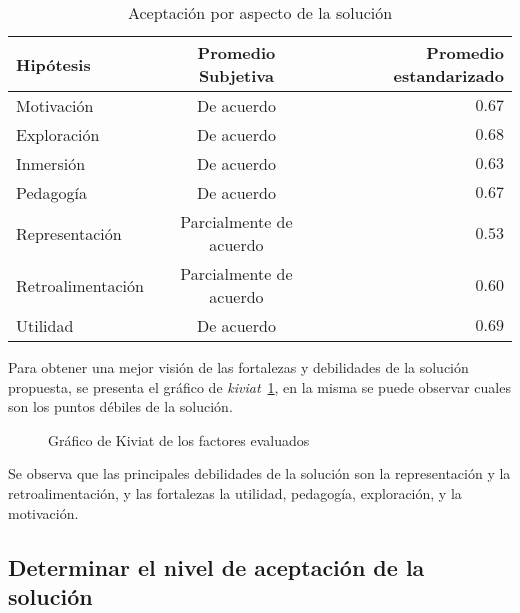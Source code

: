\begin{table}[!hbt]
\centering
\begin{tabular}{lcr}
\toprule
Hipótesis         & Promedio Subjetiva      & Promedio estandarizado \\
\midrule
Motivación        & De acuerdo              & $0.67$  \\
Exploración       & De acuerdo              & $0.68$  \\
Inmersión         & De acuerdo              & $0.63$  \\
Pedagogía         & De acuerdo              & $0.67$  \\
Representación    & Parcialmente de acuerdo & $0.53$  \\
Retroalimentación & Parcialmente de acuerdo & $0.60$  \\
Utilidad          & De acuerdo              & $0.69$  \\
\bottomrule
\end{tabular}
\caption{Aceptación por aspecto de la solución}
\label{tab:resultado_resumen_aspectos_aceptacion}
\end{table}

Para  obtener una mejor visión de las fortalezas y debilidades de la solución
propuesta, se presenta el gráfico de \emph{kiviat}~\ref{fig:subjetiva_kiviat},
en la misma se puede observar cuales son los puntos débiles de la solución.

\begin{figure}[!ht]
\label{fig:subjetiva_kiviat}
\caption{Gráfico de Kiviat de los factores evaluados}
\end{figure}

Se observa que las principales debilidades de la solución son la representación
y la retroalimentación, y las fortalezas la utilidad, pedagogía, exploración, y
la motivación.

\subsection{Determinar el nivel de aceptación de la solución}

